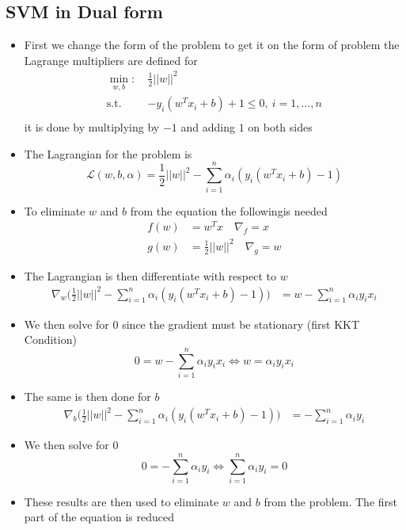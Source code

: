 \documentclass[a4, english]{article}
\begin{document}
\subsection{SVM in Dual form}
\begin{itemize}
	\item First we change the form of the problem to get it on the form of problem the Lagrange multipliers are defined for 
\begin{align*}
    \min_{w,b}: \ & \frac12||w||^2\\
    \text{s.t.} \ & - y_i(w^T x_i+b) + 1 \leq 0, \ i= 1, \dots, n \\
\end{align*}
  it is done by multiplying by $-1$ and adding $1$ on both sides
  \item The Lagrangian for the problem is
\begin{equation*}
  \mathcal L (w,b,\alpha) = \frac12||w||^2 - \sum_{i=1}^n \alpha_i (y_i(w^T x_i +b) -1)
\end{equation*}
  \item To eliminate $w$ and $b$ from the equation the followingis needed  
\begin{align*}
  f(w) &= w^T x \quad \nabla_f = x \\
  g(w) &= \frac12 ||w||^2 \quad \nabla_g = w
\end{align*}
  \item The Lagrangian is then differentiate with respect to $w$ 
\begin{align*}
  \nabla_w  \bigg(\frac12||w||^2 - \sum_{i=1}^n \alpha_i (y_i(w^T x_i +b) -1)\bigg) &= w - \sum_{i=1}^n \alpha_i y_i x_i
\end{align*}
  \item We then solve for $0$ since the gradient must be stationary (first KKT Condition)
\begin{equation*}
  0 = w- \sum_{i=1}^n \alpha_i y_i x_i \iff w = \alpha_i y_i x_i
\end{equation*}
  \item The same is then done for $b$ 
\begin{align*}
  \nabla_b \bigg(\frac12||w||^2 - \sum_{i=1}^n \alpha_i (y_i(w^T x_i +b) -1)\bigg) &= -\sum_{i=1}^n\alpha_i y_i 
\end{align*}
  \item We then solve for $0$ 
\begin{equation*}
  0 = -\sum_{i=1}^n\alpha_i y_i  \iff \sum_{i=1}^n\alpha_i y_i = 0
\end{equation*}
  \item These results are then used to eliminate $w$ and $b$ from the problem. The first part of the equation is reduced 

\end{itemize}
\end{document}
